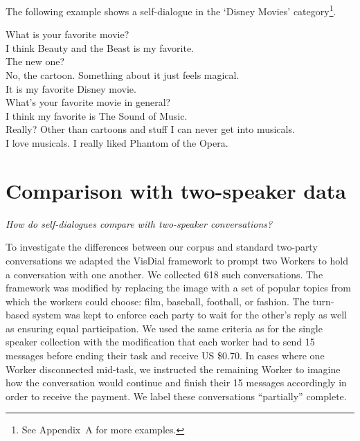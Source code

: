 \documentclass[11pt,a4paper]{article}
\begin{document}
The following example shows a self-dialogue in the `Disney Movies' category\footnote{See Appendix~A for more examples.}.

\begin{tcolorbox}[colback=white]
What is your favorite movie?\\
I think Beauty and the Beast is my favorite.\\
The new one?\\
No, the cartoon. Something about it just feels magical.\\
It is my favorite Disney movie.\\
What's your favorite movie in general?\\
I think my favorite is The Sound of Music.\\
Really? Other than cartoons and stuff I can never get into musicals.\\
I love musicals. I really liked Phantom of the Opera.
\end{tcolorbox}


\section{Comparison with two-speaker data}
\label{sec:corpus_discussion}

\textit{How do self-dialogues compare with two-speaker conversations?}

To investigate the differences between our corpus and standard two-party conversations we adapted the VisDial framework \cite{DBLP:journals/corr/DasKGSYMPB16} to prompt two Workers to hold a conversation with one another. We collected 618 such conversations. The framework was modified by replacing the image with a set of popular topics from which the workers could choose: film, baseball, football, or fashion. The turn-based system was kept to enforce each party to wait for the other's reply as well as ensuring equal participation. We used the same criteria as for the single speaker collection with the modification that each worker had to send 15 messages before ending their task and receive US \$0.70. In cases where one Worker disconnected mid-task, we instructed the remaining Worker to imagine how the conversation would continue and finish their 15 messages accordingly in order to receive the payment. We label these conversations ``partially'' complete.
\end{document}
